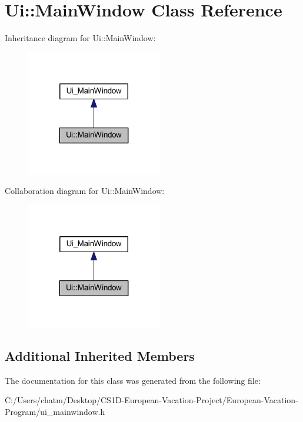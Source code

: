 \hypertarget{class_ui_1_1_main_window}{}\section{Ui\+::Main\+Window Class Reference}
\label{class_ui_1_1_main_window}


Inheritance diagram for Ui\+::Main\+Window\+:
\nopagebreak
\begin{figure}[H]
\begin{center}
\leavevmode
\includegraphics[width=167pt]{class_ui_1_1_main_window__inherit__graph}
\end{center}
\end{figure}


Collaboration diagram for Ui\+::Main\+Window\+:
\nopagebreak
\begin{figure}[H]
\begin{center}
\leavevmode
\includegraphics[width=167pt]{class_ui_1_1_main_window__coll__graph}
\end{center}
\end{figure}
\subsection*{Additional Inherited Members}


The documentation for this class was generated from the following file\+:\begin{DoxyCompactItemize}
\item 
C\+:/\+Users/chatm/\+Desktop/\+C\+S1\+D-\/\+European-\/\+Vacation-\/\+Project/\+European-\/\+Vacation-\/\+Program/ui\+\_\+mainwindow.\+h\end{DoxyCompactItemize}
